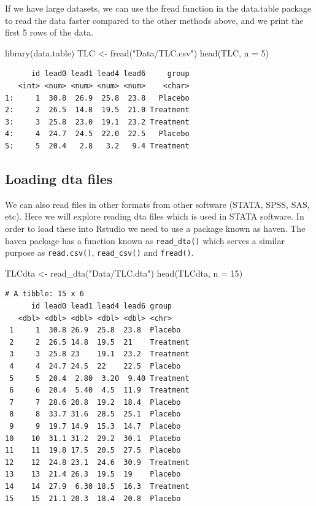 \documentclass[
  letterpaper,
  DIV=11,
  numbers=noendperiod]{scrreprt}
\newenvironment{Shaded}{\begin{snugshade}}{\end{snugshade}}
\newcommand{\AttributeTok}[1]{\textcolor[rgb]{0.40,0.45,0.13}{#1}}
\newcommand{\DecValTok}[1]{\textcolor[rgb]{0.68,0.00,0.00}{#1}}
\newcommand{\FunctionTok}[1]{\textcolor[rgb]{0.28,0.35,0.67}{#1}}
\newcommand{\NormalTok}[1]{\textcolor[rgb]{0.00,0.23,0.31}{#1}}
\newcommand{\OtherTok}[1]{\textcolor[rgb]{0.00,0.23,0.31}{#1}}
\newcommand{\StringTok}[1]{\textcolor[rgb]{0.13,0.47,0.30}{#1}}
\begin{document}
If we have large datasets, we can use the fread function in the
data.table package to read the data faster compared to the other methods
above, and we print the first 5 rows of the data.

\begin{Shaded}
\begin{Highlighting}[]
\FunctionTok{library}\NormalTok{(data.table)}
\NormalTok{TLC }\OtherTok{\textless{}{-}} \FunctionTok{fread}\NormalTok{(}\StringTok{"Data/TLC.csv"}\NormalTok{)}
\FunctionTok{head}\NormalTok{(TLC, }\AttributeTok{n =} \DecValTok{5}\NormalTok{)}
\end{Highlighting}
\end{Shaded}

\begin{verbatim}
      id lead0 lead1 lead4 lead6     group
   <int> <num> <num> <num> <num>    <char>
1:     1  30.8  26.9  25.8  23.8   Placebo
2:     2  26.5  14.8  19.5  21.0 Treatment
3:     3  25.8  23.0  19.1  23.2 Treatment
4:     4  24.7  24.5  22.0  22.5   Placebo
5:     5  20.4   2.8   3.2   9.4 Treatment
\end{verbatim}

\hypertarget{loading-dta-files}{%
\subsection*{Loading dta files}\label{loading-dta-files}}

We can also read files in other formats from other software (STATA,
SPSS, SAS, etc). Here we will explore reading dta files which is used in
STATA software. In order to load these into Rstudio we need to use a
package known as haven. The haven package has a function known as
\texttt{read\_dta()} which serves a similar purpose as
\texttt{read.csv()}, \texttt{read\_csv()} and \texttt{fread()}.

\begin{Shaded}
\begin{Highlighting}[]
\NormalTok{TLCdta }\OtherTok{\textless{}{-}} \FunctionTok{read\_dta}\NormalTok{(}\StringTok{"Data/TLC.dta"}\NormalTok{)}
\FunctionTok{head}\NormalTok{(TLCdta, }\AttributeTok{n =} \DecValTok{15}\NormalTok{)}
\end{Highlighting}
\end{Shaded}

\begin{verbatim}
# A tibble: 15 x 6
      id lead0 lead1 lead4 lead6 group    
   <dbl> <dbl> <dbl> <dbl> <dbl> <chr>    
 1     1  30.8 26.9  25.8  23.8  Placebo  
 2     2  26.5 14.8  19.5  21    Treatment
 3     3  25.8 23    19.1  23.2  Treatment
 4     4  24.7 24.5  22    22.5  Placebo  
 5     5  20.4  2.80  3.20  9.40 Treatment
 6     6  20.4  5.40  4.5  11.9  Treatment
 7     7  28.6 20.8  19.2  18.4  Placebo  
 8     8  33.7 31.6  28.5  25.1  Placebo  
 9     9  19.7 14.9  15.3  14.7  Placebo  
10    10  31.1 31.2  29.2  30.1  Placebo  
11    11  19.8 17.5  20.5  27.5  Placebo  
12    12  24.8 23.1  24.6  30.9  Treatment
13    13  21.4 26.3  19.5  19    Placebo  
14    14  27.9  6.30 18.5  16.3  Treatment
15    15  21.1 20.3  18.4  20.8  Placebo  
\end{verbatim}
\end{document}
